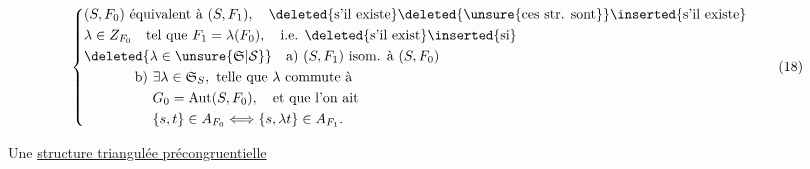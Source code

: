 \[
\left\{\begin{aligned}
&(S,F_0)\ \text{équivalent à }(S,F_1),\quad\deleted{\text{s'il existe}}\deleted{\text{\unsure{ces str. sont}}}\inserted{\text{s'il existe}}\\
&\lambda\in Z_{F_0}\quad\text{tel que } F_1=\lambda(F_0),\quad\text{i.e. }\deleted{\text{s'il exist}}\inserted{\text{si}}\\
&\deleted{\lambda\in\unsure{\mathfrak S|\mathcal S}}\quad\mathrm a)\ (S,F_1)\ \text{isom. à }(S,F_0)\\
&\hphantom{\lambda\in\mathfrak S\quad}\mathrm b)\ \exists\lambda\in\mathfrak S_S,\ \text{telle que }\lambda\text{ commute à}\\
&\hphantom{\lambda\in\mathfrak S\quad\mathrm b)\ }G_0=\mathrm{Aut}(S,F_0),\quad\text{et que l'on ait}\\
&\hphantom{\lambda\in\mathfrak S\quad\mathrm b)\ }\{s,t\}\in A_{F_0}\Longleftrightarrow\{s,\lambda t\}\in A_{F_1}.
\end{aligned}\right.\tag*{(18)}
\]

 Une \uline{structure triangulée précongruentielle}


